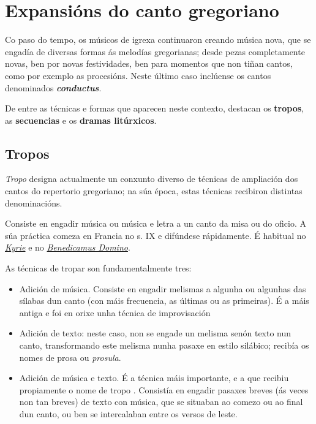 \documentclass[a4paper, twoside]{templates/ociamthesis}
\begin{document}
\hypertarget{expansiuxf3ns-do-canto-gregoriano}{%
\section{Expansións do canto gregoriano}\label{expansiuxf3ns-do-canto-gregoriano}}

Co paso do tempo, os músicos de igrexa continuaron creando música nova, que se engadía de diversas formas ás melodías gregorianas; desde pezas completamente novas, ben por novas festividades, ben para momentos que non tiñan cantos, como por exemplo as procesións. Neste último caso inclúense os cantos denominados \textbf{\emph{conductus}}.

De entre as técnicas e formas que aparecen neste contexto, destacan os \textbf{tropos}, as \textbf{secuencias} e os \textbf{dramas litúrxicos}.

\hypertarget{tropos}{%
\subsection{Tropos}\label{tropos}}

\emph{Tropo} designa actualmente un conxunto diverso de técnicas de ampliación dos cantos do repertorio gregoriano; na súa época, estas técnicas recibiron distintas denominacións.

Consiste en engadir música ou música e letra a un canto da misa ou do oficio. A súa práctica comeza en Francia no s. IX e difúndese rápidamente. É habitual no \href{https://open.spotify.com/track/0wTT2YyDjlqmjHe1HOIacE}{\emph{Kyrie}} e no \href{https://es.wikipedia.org/wiki/Benedicamus_domino}{\emph{Benedicamus Domino}}.

As técnicas de tropar son fundamentalmente tres:

\begin{itemize}
\item
  Adición de música. Consiste en engadir melismas a algunha ou algunhas das sílabas dun canto (con máis frecuencia, as últimas ou as primeiras). É a máis antiga e foi en orixe unha técnica de improvisación
\item
  Adición de texto: neste caso, non se engade un melisma senón texto nun canto, transformando este melisma nunha pasaxe en estilo silábico; recibía os nomes de prosa ou \emph{prosula}.
\item
  Adición de música e texto. É a técnica máis importante, e a que recibiu propiamente o nome de tropo . Consistía en engadir pasaxes breves (ás veces non tan breves) de texto con música, que se situaban ao comezo ou ao final dun canto, ou ben se intercalaban entre os versos de leste.
\end{itemize}
\end{document}
